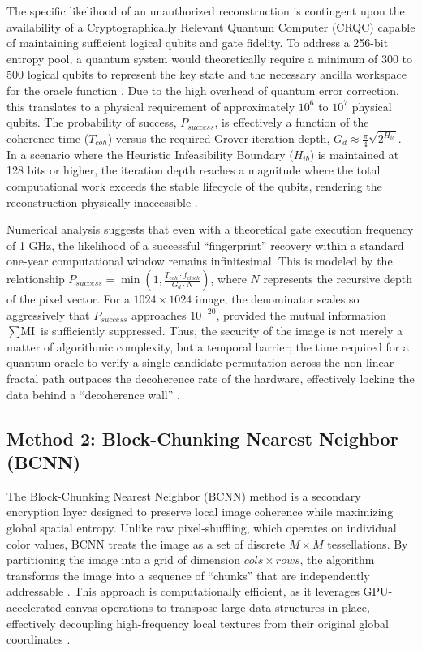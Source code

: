 \documentclass[12pt,fleqn]{article}
\begin{document}
The specific likelihood of an unauthorized reconstruction is contingent upon the availability of a Cryptographically Relevant Quantum Computer (CRQC) capable of maintaining sufficient logical qubits and gate fidelity. To address a 256-bit entropy pool, a quantum system would theoretically require a minimum of 300 to 500 logical qubits to represent the key state and the necessary ancilla workspace for the oracle function \cite{gidney2021factor}. Due to the high overhead of quantum error correction, this translates to a physical requirement of approximately $10^6$ to $10^7$ physical qubits. The probability of success, $P_{success}$, is effectively a function of the coherence time ($T_{coh}$) versus the required Grover iteration depth, $G_d \approx \frac{\pi}{4} \sqrt{2^{H_{ib}}}$. In a scenario where the Heuristic Infeasibility Boundary ($H_{ib}$) is maintained at 128 bits or higher, the iteration depth reaches a magnitude where the total computational work exceeds the stable lifecycle of the qubits, rendering the reconstruction physically inaccessible \cite{preskill2018quantum}.

Numerical analysis suggests that even with a theoretical gate execution frequency of 1 GHz, the likelihood of a successful ``fingerprint'' recovery within a standard one-year computational window remains infinitesimal. This is modeled by the relationship $P_{success} = \min(1, \frac{T_{coh} \cdot f_{clock}}{G_d \cdot N})$, where $N$ represents the recursive depth of the pixel vector. For a $1024 \times 1024$ image, the denominator scales so aggressively that $P_{success}$ approaches $10^{-20}$, provided the mutual information $\sum \text{MI}$ is sufficiently suppressed. Thus, the security of the image is not merely a matter of algorithmic complexity, but a temporal barrier; the time required for a quantum oracle to verify a single candidate permutation across the non-linear fractal path outpaces the decoherence rate of the hardware, effectively locking the data behind a ``decoherence wall'' \cite{shor1994quantum}.

\subsection{Method 2: Block-Chunking Nearest Neighbor (BCNN)}

The Block-Chunking Nearest Neighbor (BCNN) method is a secondary encryption layer designed to preserve local image coherence while maximizing global spatial entropy. Unlike raw pixel-shuffling, which operates on individual color values, BCNN treats the image as a set of discrete $M \times M$ tessellations. By partitioning the image into a grid of dimension $cols \times rows$, the algorithm transforms the image into a sequence of ``chunks'' that are independently addressable \cite{bourbakis1992image}. This approach is computationally efficient, as it leverages GPU-accelerated canvas operations to transpose large data structures in-place, effectively decoupling high-frequency local textures from their original global coordinates \cite{cook2005gpu}.
\end{document}
